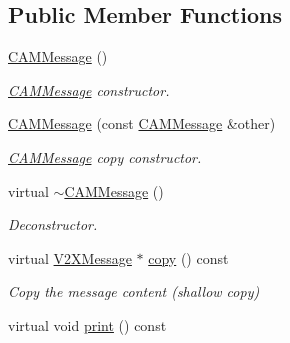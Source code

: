 \subsection*{Public Member Functions}
\begin{DoxyCompactItemize}
\item 
\hyperlink{classCAMMessage_a5afb86a939afcd5c384510bc882fb39a}{C\+A\+M\+Message} ()\hypertarget{classCAMMessage_a5afb86a939afcd5c384510bc882fb39a}{}\label{classCAMMessage_a5afb86a939afcd5c384510bc882fb39a}

\begin{DoxyCompactList}\small\item\em \hyperlink{classCAMMessage}{C\+A\+M\+Message} constructor. \end{DoxyCompactList}\item 
\hyperlink{classCAMMessage_aa98df842a81887dd737edd6f8d987a59}{C\+A\+M\+Message} (const \hyperlink{classCAMMessage}{C\+A\+M\+Message} \&other)
\begin{DoxyCompactList}\small\item\em \hyperlink{classCAMMessage}{C\+A\+M\+Message} copy constructor. \end{DoxyCompactList}\item 
virtual \hyperlink{classCAMMessage_a2bc3fbfcf7ff6808a864e67d9fbc3105}{$\sim$\+C\+A\+M\+Message} ()\hypertarget{classCAMMessage_a2bc3fbfcf7ff6808a864e67d9fbc3105}{}\label{classCAMMessage_a2bc3fbfcf7ff6808a864e67d9fbc3105}

\begin{DoxyCompactList}\small\item\em Deconstructor. \end{DoxyCompactList}\item 
virtual \hyperlink{classV2XMessage}{V2\+X\+Message} $\ast$ \hyperlink{classCAMMessage_a27935907b25d9e8648891a281dd48df6}{copy} () const 
\begin{DoxyCompactList}\small\item\em Copy the message content (shallow copy) \end{DoxyCompactList}\item 
virtual void \hyperlink{classCAMMessage_ae2b5d2a030f6a6d6580c900ee4c38db5}{print} () const \hypertarget{classCAMMessage_ae2b5d2a030f6a6d6580c900ee4c38db5}{}\label{classCAMMessage_ae2b5d2a030f6a6d6580c900ee4c38db5}


\end{DoxyCompactItemize}

